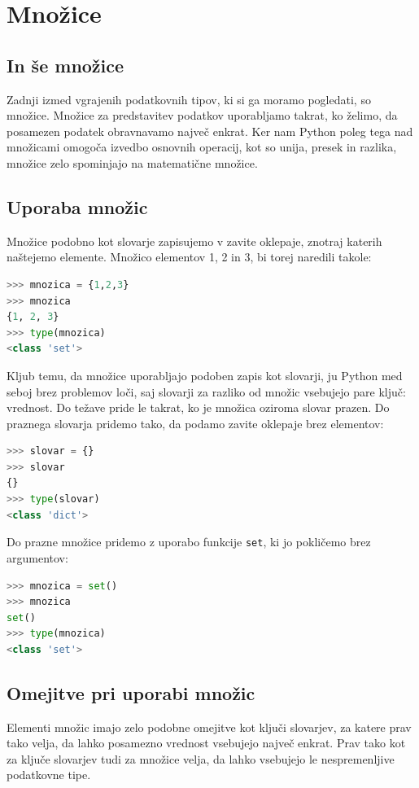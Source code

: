 \chapter{Množice}

\section{In še množice}

Zadnji izmed vgrajenih podatkovnih tipov, ki si ga moramo pogledati, so množice. Množice za predstavitev podatkov uporabljamo takrat, ko želimo, da posamezen podatek obravnavamo največ enkrat. Ker nam Python poleg tega nad množicami omogoča izvedbo osnovnih operacij, kot so unija, presek in razlika, množice zelo spominjajo na matematične množice. 

\section{Uporaba množic}

Množice podobno kot slovarje zapisujemo v zavite oklepaje, znotraj katerih naštejemo elemente. Množico elementov 1, 2 in 3, bi torej naredili takole:
\begin{lstlisting}[language=Python]
>>> mnozica = {1,2,3}
>>> mnozica
{1, 2, 3}
>>> type(mnozica)
<class 'set'>
\end{lstlisting}
Kljub temu, da množice uporabljajo podoben zapis kot slovarji, ju Python med seboj brez problemov loči, saj slovarji za razliko od množic vsebujejo pare ključ: vrednost. Do težave pride le takrat, ko je množica oziroma slovar prazen. Do praznega slovarja pridemo tako, da podamo zavite oklepaje brez elementov:
\begin{lstlisting}[language=Python]
>>> slovar = {}
>>> slovar
{}
>>> type(slovar)
<class 'dict'>
\end{lstlisting}
Do prazne množice pridemo z uporabo funkcije \texttt{set}, ki jo pokličemo brez argumentov:
\begin{lstlisting}[language=Python]
>>> mnozica = set()
>>> mnozica
set()
>>> type(mnozica)
<class 'set'>
\end{lstlisting}

\section{Omejitve pri uporabi množic}

Elementi množic imajo zelo podobne omejitve kot ključi slovarjev, za katere prav tako velja, da lahko posamezno vrednost vsebujejo največ enkrat. Prav tako kot za ključe slovarjev tudi za množice velja, da lahko vsebujejo le nespremenljive podatkovne tipe. 

